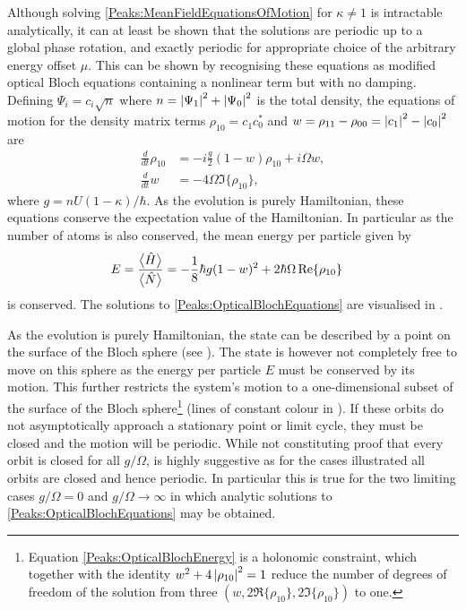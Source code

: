 Although solving \eqref{Peaks:MeanFieldEquationsOfMotion} for $\kappa \neq 1$ is intractable analytically, it can at least be shown that the solutions are periodic up to a global phase rotation, and exactly periodic for appropriate choice of the arbitrary energy offset $\mu$. This can be shown by recognising these equations as modified optical Bloch equations containing a nonlinear term but with no damping. Defining $\Psi_i = c_i\sqrt{n}$ where $n = \left|\Psi_1\right|^2 + \left|\Psi_0\right|^2$ is the total density, the equations of motion for the density matrix terms $\rho_{10} = c_{1}^{}c_{0}^*$ and $w = \rho_{11}-\rho_{00} = \left|c_1\right|^2 - \left|c_0\right|^2$ are
\begin{subequations}
    \label{Peaks:OpticalBlochEquations}
    \begin{align}
        \frac{d}{dt}\rho_{10} &= -i\frac{g}{2} (1-w)\rho_{10} + i \Omega w,\\
        \frac{d }{dt}w &= -4 \Omega \Im\{\rho_{10}\},
    \end{align}
\end{subequations}
where $g = n U (1-\kappa)/\hbar$. As the evolution is purely Hamiltonian, these equations conserve the expectation value of the Hamiltonian. In particular as the number of atoms is also conserved, the mean energy per particle given by
\begin{align}
    E &= \frac{\mean{\hat{H}}}{\mean{\hat{N}}} = -\frac{1}{8}\hbar g(1 - w)^2 + 2 \hbar \Omega \Re\{\rho_{10}\}
    \label{Peaks:OpticalBlochEnergy}
\end{align}
is conserved. The solutions to \eqref{Peaks:OpticalBlochEquations} are visualised in .

As the evolution is purely Hamiltonian, the state can be described by a point on the surface of the Bloch sphere (see ).  The state is however not completely free to move on this sphere as the energy per particle $E$ must be conserved by its motion. This further restricts the system's motion to a one-dimensional subset of the surface of the Bloch sphere\footnote{Equation \eqref{Peaks:OpticalBlochEnergy} is a holonomic constraint, which together with the identity $w^2 + 4 \left|\rho_{10}\right|^2=1$ reduce the number of degrees of freedom of the solution from three $(w, 2\Re\{\rho_{10}\}, 2\Im\{\rho_{10}\})$ to one.} (lines of constant colour in ). If these orbits do not asymptotically approach a stationary point or limit cycle, they must be closed and the motion will be periodic. While not constituting proof that every orbit is closed for all $g/\Omega$,  is highly suggestive as for the cases illustrated all orbits are closed and hence periodic. In particular this is true for the two limiting cases $g/\Omega = 0$ and $g/\Omega \rightarrow \infty$ in which analytic solutions to \eqref{Peaks:OpticalBlochEquations} may be obtained.


